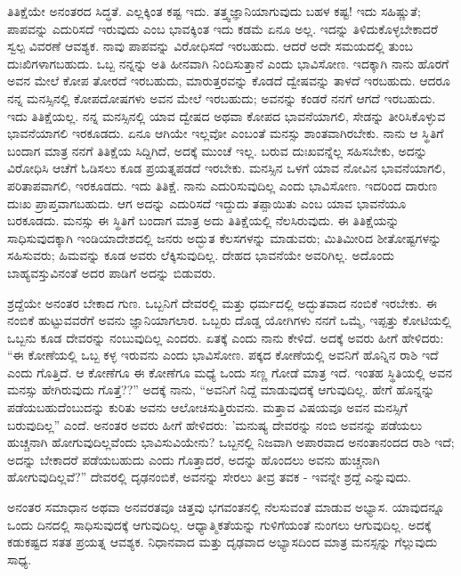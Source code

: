 ತಿತಿಕ್ಷೆಯೇ ಅನಂತರದ ಸಿದ್ಧತೆ. ಎಲ್ಲಕ್ಕಿಂತ ಕಷ್ಟ ಇದು. ತತ್ತ್ವಜ್ಞಾನಿಯಾಗುವುದು ಬಹಳ ಕಷ್ಟ! ಇದು ಸಹಿಷ್ಣುತೆ; ಪಾಪವನ್ನು ಎದುರಿಸದೆ ಇರುವುದು ಎಂಬ ಭಾವಕ್ಕಿಂತ ಇದು ಕಡಮೆ ಏನೂ ಅಲ್ಲ. ಇದನ್ನು ತಿಳಿದುಕೊಳ್ಳಬೇಕಾದರೆ ಸ್ವಲ್ಪ ವಿವರಣೆ ಆವಶ್ಯಕ. ನಾವು ಪಾಪವನ್ನು ವಿರೋಧಿಸದೆ ಇರಬಹುದು. ಆದರೆ ಅದೇ ಸಮಯದಲ್ಲಿ ತುಂಬ ದುಃಖಿಗಳಾಗಬಹುದು. ಒಬ್ಬ ನನ್ನನ್ನು ಅತಿ ಹೀನವಾಗಿ ನಿಂದಿಸುತ್ತಾನೆ ಎಂದು ಭಾವಿಸೋಣ. ಇದಕ್ಕಾಗಿ ನಾನು ಹೊರಗೆ ಅವನ ಮೇಲೆ ಕೋಪ ತೋರದೆ ಇರಬಹುದು, ಮಾರುತ್ತರವನ್ನು ಕೊಡದೆ ದ್ವೇಷವನ್ನು ತಾಳದೆ ಇರಬಹುದು. ಆದರೂ ನನ್ನ ಮನಸ್ಸಿನಲ್ಲಿ ಕೋಪದೋಷಗಳು ಅವನ ಮೇಲೆ ಇರಬಹುದು; ಅವನನ್ನು ಕಂಡರೆ ನನಗೆ ಆಗದೆ ಇರಬಹುದು. ಇದು ತಿತಿಕ್ಷೆಯಲ್ಲ. ನನ್ನ ಮನಸ್ಸಿನಲ್ಲಿ ಯಾವ ದ್ವೇಷದ ಅಥವಾ ಕೋಪದ ಭಾವನೆಯಾಗಲಿ, ಸೇಡನ್ನು ತೀರಿಸಿಕೊಳ್ಳುವ ಭಾವನೆಯಾಗಲಿ ಇರಕೂಡದು. ಏನೂ ಆಗಿಯೇ ಇಲ್ಲವೋ ಎಂಬಂತೆ ಮನಸ್ಸು ಶಾಂತವಾಗಿರಬೇಕು. ನಾನು ಆ ಸ್ಥಿತಿಗೆ ಬಂದಾಗ ಮಾತ್ರ ನನಗೆ ತಿತಿಕ್ಷೆಯ ಸಿದ್ದಿಗಿದೆ, ಅದಕ್ಕೆ ಮುಂಚೆ ಇಲ್ಲ. ಬರುವ ದುಃಖವನ್ನೆಲ್ಲ ಸಹಿಸಬೇಕು, ಅದನ್ನು ವಿರೋಧಿಸಿ ಆಚೆಗೆ ಓಡಿಸಲು ಕೂಡ ಪ್ರಯತ್ನಪಡದೆ ಇರಬೇಕು. ಮನಸ್ಸಿನ ಒಳಗೆ ಯಾವ ನೋವಿನ ಭಾವನೆಯಾಗಲಿ, ಪರಿತಾಪವಾಗಲಿ, ಇರಕೂಡದು. ಇದು ತಿತಿಕ್ಷೆ. ನಾನು ಎದುರಿಸುವುದಿಲ್ಲ ಎಂದು ಭಾವಿಸೋಣ. ಇದರಿಂದ ದಾರುಣ ದುಃಖ ಪ್ರಾಪ್ತವಾಗಬಹುದು. ಆಗ ಅದನ್ನು ಎದುರಿಸದೆ ಇದ್ದುದು ತಪ್ಪಾಯಿತು ಎಂಬ ಯಾವ ಭಾವನೆಯೂ ಬರಕೂಡದು. ಮನಸ್ಸು ಈ ಸ್ಥಿತಿಗೆ ಬಂದಾಗ ಮಾತ್ರ ಅದು ತಿತಿಕ್ಷೆಯಲ್ಲಿ ನೆಲಸಿರುವುದು. ಈ ತಿತಿಕ್ಷೆಯನ್ನು ಸಾಧಿಸುವುದಕ್ಕಾಗಿ ಇಂಡಿಯಾದೇಶದಲ್ಲಿ ಜನರು ಅದ್ಭುತ ಕೆಲಸಗಳನ್ನು ಮಾಡುವರು; ಮಿತಿಮೀರಿದ ಶೀತೋಷ್ಟಗಳನ್ನು ಸಹಿಸುವರು; ಹಿಮವನ್ನು ಕೂಡ ಅವರು ಲೆಕ್ಕಿಸುವುದಿಲ್ಲ. ದೇಹದ ಭಾವನೆಯೇ ಅವರಿಗಿಲ್ಲ. ಅದೊಂದು ಬಾಹ್ಯವಸ್ತುವಿನಂತೆ ಅದರ ಪಾಡಿಗೆ ಅದನ್ನು ಬಿಡುವರು.

ಶ್ರದ್ದೆಯೇ ಅನಂತರ ಬೇಕಾದ ಗುಣ. ಒಬ್ಬನಿಗೆ ದೇವರಲ್ಲಿ ಮತ್ತು ಧರ್ಮದಲ್ಲಿ ಅದ್ಭುತವಾದ ನಂಬಿಕೆ ಇರಬೇಕು. ಈ ನಂಬಿಕೆ ಹುಟ್ಟುವವರೆಗೆ ಅವನು ಜ್ಞಾನಿಯಾಗಲಾರ. ಒಬ್ಬರು ದೊಡ್ಡ ಯೋಗಿಗಳು ನನಗೆ ಒಮ್ಮೆ, ಇಪ್ಪತ್ತು ಕೋಟಿಯಲ್ಲಿ ಒಬ್ಬನು ಕೂಡ ದೇವರನ್ನು ನಂಬುವುದಿಲ್ಲ ಎಂದರು. ಏತಕ್ಕೆ ಎಂದು ನಾನು ಕೇಳಿದೆ. ಅದಕ್ಕೆ ಅವರು ಹೀಗೆ ಹೇಳಿದರು: “ಈ ಕೋಣೆಯಲ್ಲಿ ಒಬ್ಬ ಕಳ್ಳ ಇರುವನು ಎಂದು ಭಾವಿಸೋಣ. ಪಕ್ಕದ ಕೋಣೆಯಲ್ಲಿ ಅವನಿಗೆ ಹೊನ್ನಿನ ರಾಶಿ ಇದೆ ಎಂದು ಗೊತ್ತಿದೆ. ಆ ಕೋಣೆಗೂ ಈ ಕೋಣೆಗೂ ಮಧ್ಯೆ ಒಂದು ಸಣ್ಣ ಗೋಡೆ ಮಾತ್ರ ಇದೆ. ಇಂತಹ ಸ್ಥಿತಿಯಲ್ಲಿ ಅವನ ಮನಸ್ಸು ಹೇಗಿರುವುದು ಗೊತ್ತೆ??” ಅದಕ್ಕೆ ನಾನು, “ಅವನಿಗೆ ನಿದ್ದೆ ಮಾಡುವುದಕ್ಕೆ ಆಗುವುದಿಲ್ಲ. ಹೇಗೆ ಹೊನ್ನನ್ನು ಪಡೆಯಬಹುದೆಂಬುದನ್ನು ಕುರಿತು ಅವನು ಆಲೋಚಿಸುತ್ತಿರುವನು. ಮತ್ತಾವ ವಿಷಯವೂ ಅವನ ಮನಸ್ಸಿಗೆ ಬರುವುದಿಲ್ಲ'' ಎಂದೆ. ಅನಂತರ ಅವರು ಹೀಗೆ ಹೇಳಿದರು: 'ಮನುಷ್ಯ ದೇವರನ್ನು ನಂಬಿ ಅವನನ್ನು ಪಡೆಯಲು ಹುಚ್ಚನಾಗಿ ಹೋಗುವುದಿಲ್ಲವೆಂದು ಭಾವಿಸುವಿಯೇನು? ಒಬ್ಬನಲ್ಲಿ ನಿಜವಾಗಿ ಅಪಾರವಾದ ಅನಂತಾನಂದದ ರಾಶಿ ಇದೆ; ಅದನ್ನು ಬೇಕಾದರೆ ಪಡೆಯಬಹುದು ಎಂದು ಗೊತ್ತಾದರೆ, ಅದನ್ನು ಹೊಂದಲು ಅವನು ಹುಚ್ಚನಾಗಿ ಹೋಗುವುದಿಲ್ಲವೆ?'' ದೇವರಲ್ಲಿ ದೃಢನಂಬಿಕೆ, ಅವನನ್ನು ಸೇರಲು ತೀವ್ರ ತವಕ - ಇವನ್ನೇ ಶ್ರದ್ದೆ ಎನ್ನುವುದು.

ಅನಂತರ ಸಮಾಧಾನ ಅಥವಾ ಅನವರತವೂ ಚಿತ್ತವು ಭಗವಂತನಲ್ಲಿ ನೆಲಸುವಂತೆ ಮಾಡುವ ಅಭ್ಯಾಸ. ಯಾವುದನ್ನೂ ಒಂದು ದಿನದಲ್ಲಿ ಸಾಧಿಸುವುದಕ್ಕೆ ಆಗುವುದಿಲ್ಲ. ಆಧ್ಯಾತ್ಮಿಕತೆಯನ್ನು ಗುಳಿಗೆಯಂತೆ ನುಂಗಲು ಆಗುವುದಿಲ್ಲ. ಅದಕ್ಕೆ ಕಡುಕಷ್ಟದ ಸತತ ಪ್ರಯತ್ನ ಆವಶ್ಯಕ. ನಿಧಾನವಾದ ಮತ್ತು ದೃಢವಾದ ಅಭ್ಯಾಸದಿಂದ ಮಾತ್ರ ಮನಸ್ಸನ್ನು ಗೆಲ್ಲುವುದು ಸಾಧ್ಯ.


